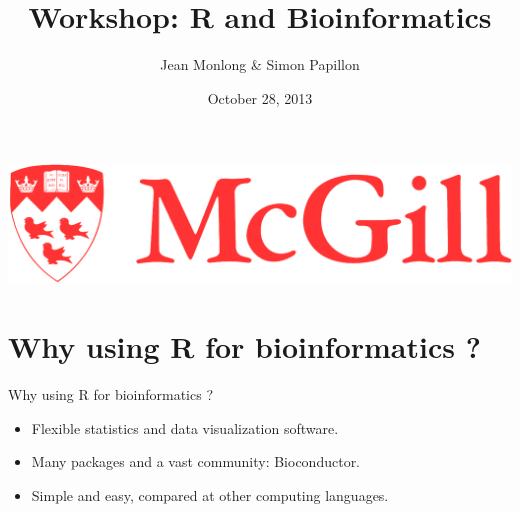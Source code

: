 \documentclass[10pt]{beamer}
\title{Workshop: R and Bioinformatics}
\author{Jean Monlong \& Simon Papillon}
\institute{Human Genetics department}
\date{October 28, 2013}
\begin{document}
\begin{frame}
  \titlepage
  \centering
  \includegraphics[page=1,height=.1\textheight]{imgs/McGill-Logo1.png}

\end{frame}

\section{Why using R for bioinformatics ?}

\begin{frame}[label=handout]{Why using R for bioinformatics ?}
  \begin{itemize}
  \item Flexible statistics and data visualization software.
  \item Many packages and a vast community: Bioconductor.
  \item Simple and easy, compared at other computing languages.
  \end{itemize}
\end{frame}

\end{document}
